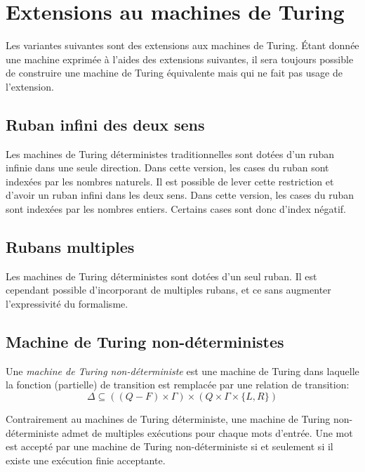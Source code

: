 \section{Extensions au machines de Turing}

Les variantes suivantes sont des extensions aux machines de Turing.
Étant donnée une machine exprimée à l'aides des extensions suivantes, il sera toujours possible de construire une machine de Turing équivalente mais qui ne fait pas usage de l'extension. 

\subsection{Ruban infini des deux sens}

Les machines de Turing déterministes traditionnelles sont dotées d'un ruban infinie dans une seule direction.
Dans cette version, les cases du ruban sont indexées par les nombres naturels.
Il est possible de lever cette restriction et d'avoir un ruban infini dans les deux sens.
Dans cette version, les cases du ruban sont indexées par les nombres entiers.
Certains cases sont donc d'index négatif.

\subsection{Rubans multiples}

Les machines de Turing déterministes sont dotées d'un seul ruban.
Il est cependant possible d'incorporant de multiples rubans, et ce sans augmenter l'expressivité du formalisme. 

\subsection{Machine de Turing non-déterministes}

Une \og \textit{machine de Turing non-déterministe} \fg{} est une machine de Turing dans laquelle la fonction (partielle) de transition est remplacée par une relation de transition:
\[
\Delta \subseteq ((Q - F) \times \Gamma) \times (Q \times \Gamma \times \{L, R\})
\]

Contrairement au machines de Turing déterministe, une machine de Turing non-déterministe admet de multiples exécutions pour chaque mots d'entrée.
Une mot est accepté par une machine de Turing non-déterministe si et seulement si il existe une exécution finie acceptante.

